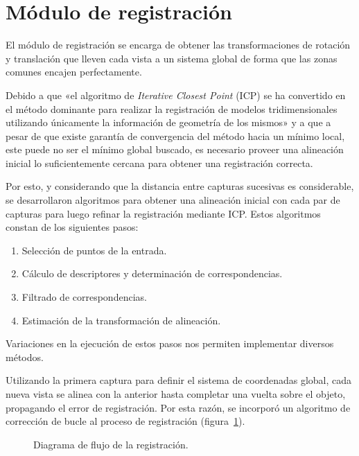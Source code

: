 \section{Módulo de registración}
	El módulo de registración se encarga de obtener las transformaciones de rotación y translación
	que lleven cada vista a un sistema global de forma
	que las zonas comunes encajen perfectamente.

	Debido a que
	«el algoritmo de \emph{Iterative Closest Point} (ICP) se ha convertido en el
	método dominante para realizar la registración de modelos tridimensionales
	utilizando únicamente la información de geometría de los mismos\cite{Rusinkiewicz02real-time3d}»
	y a que a pesar de que existe garantía de convergencia del método hacia un mínimo local,
	este puede no ser el mínimo global buscado, es necesario proveer una alineación inicial
	lo suficientemente cercana para obtener una registración correcta\cite{regBesl92}.

	Por esto, y considerando que la distancia entre capturas sucesivas es considerable,
	se desarrollaron algoritmos para obtener una alineación inicial
	con cada par de capturas para luego refinar la registración mediante ICP.
	Estos algoritmos constan de los siguientes pasos:
	\begin{enumerate}
		\item Selección de puntos de la entrada.
		\item Cálculo de descriptores y determinación de correspondencias.
		\item Filtrado de correspondencias.
		\item Estimación de la transformación de alineación.
	\end{enumerate}
	Variaciones en la ejecución de estos pasos nos permiten implementar diversos métodos.


	Utilizando la primera captura para definir el sistema de coordenadas
	global, cada nueva vista se alinea con la anterior hasta completar una
	vuelta sobre el objeto, propagando el error de registración.
	Por esta razón, se incorporó un algoritmo de corrección de bucle al proceso de registración
	(figura~\ref{fig:flow_registracion}).


	\begin{figure}
		\caption{\label{fig:flow_registracion}Diagrama de flujo de la registración.}
	\end{figure}


